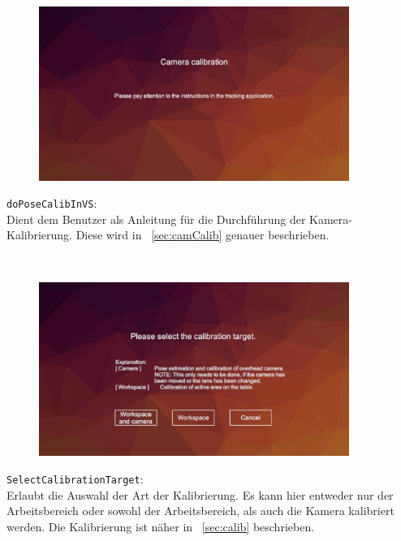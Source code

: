 \begin{minipage}{0.6\textwidth}
	\begin{figure}[H] 
		\includegraphics[trim=3cm 2cm 3cm 2cm, clip, width=0.9\textwidth]{Bilder/doPoseCalibInVS.jpg}
			\label{fig:doPoseCalibInVS}
	\end{figure}
\end{minipage}
\begin{minipage}{0.4\textwidth}
	\texttt{doPoseCalibInVS}:\\
	Dient dem Benutzer als Anleitung für die Durchführung der Kamera-Kalibrierung. Diese wird in ~\ref{sec:camCalib} genauer beschrieben.
\end{minipage}\\

\begin{minipage}{0.6\textwidth}
	\begin{figure}[H] 
		\includegraphics[trim=3cm 1cm 3cm 3cm, clip, width=0.9\textwidth]{Bilder/SelectCalibrationTarget.jpg}
			\label{fig:SelectCalibrationTarget}
	\end{figure}
\end{minipage}
\begin{minipage}{0.4\textwidth}
	\texttt{SelectCalibrationTarget}:\\
	Erlaubt die Auswahl der Art der Kalibrierung. Es kann hier entweder nur der Arbeitsbereich oder sowohl der Arbeitsbereich, als auch die Kamera kalibriert werden. Die Kalibrierung ist näher in ~\ref{sec:calib} beschrieben.
\end{minipage}\\

